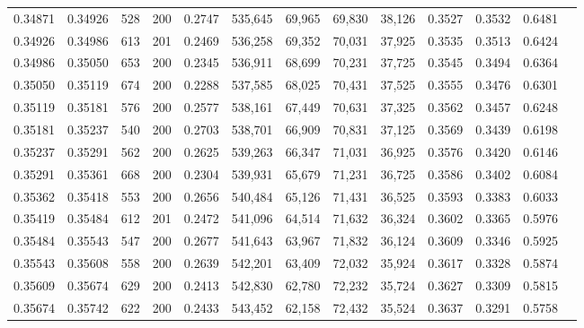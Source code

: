 \begin{tabular}{rrrrrrrrrrrrr}
0.34871 & 0.34926 &   528 & 200 &                                     0.2747 & 535,645 &  69,965 &  69,830 &  38,126 & 0.3527 & 0.3532 & 0.6481 \\
0.34926 & 0.34986 &   613 & 201 &                                     0.2469 & 536,258 &  69,352 &  70,031 &  37,925 & 0.3535 & 0.3513 & 0.6424 \\
0.34986 & 0.35050 &   653 & 200 &                                     0.2345 & 536,911 &  68,699 &  70,231 &  37,725 & 0.3545 & 0.3494 & 0.6364 \\
0.35050 & 0.35119 &   674 & 200 &                                     0.2288 & 537,585 &  68,025 &  70,431 &  37,525 & 0.3555 & 0.3476 & 0.6301 \\
0.35119 & 0.35181 &   576 & 200 &                                     0.2577 & 538,161 &  67,449 &  70,631 &  37,325 & 0.3562 & 0.3457 & 0.6248 \\
0.35181 & 0.35237 &   540 & 200 &                                     0.2703 & 538,701 &  66,909 &  70,831 &  37,125 & 0.3569 & 0.3439 & 0.6198 \\
0.35237 & 0.35291 &   562 & 200 &                                     0.2625 & 539,263 &  66,347 &  71,031 &  36,925 & 0.3576 & 0.3420 & 0.6146 \\
0.35291 & 0.35361 &   668 & 200 &                                     0.2304 & 539,931 &  65,679 &  71,231 &  36,725 & 0.3586 & 0.3402 & 0.6084 \\
0.35362 & 0.35418 &   553 & 200 &                                     0.2656 & 540,484 &  65,126 &  71,431 &  36,525 & 0.3593 & 0.3383 & 0.6033 \\
0.35419 & 0.35484 &   612 & 201 &                                     0.2472 & 541,096 &  64,514 &  71,632 &  36,324 & 0.3602 & 0.3365 & 0.5976 \\
0.35484 & 0.35543 &   547 & 200 &                                     0.2677 & 541,643 &  63,967 &  71,832 &  36,124 & 0.3609 & 0.3346 & 0.5925 \\
0.35543 & 0.35608 &   558 & 200 &                                     0.2639 & 542,201 &  63,409 &  72,032 &  35,924 & 0.3617 & 0.3328 & 0.5874 \\
0.35609 & 0.35674 &   629 & 200 &                                     0.2413 & 542,830 &  62,780 &  72,232 &  35,724 & 0.3627 & 0.3309 & 0.5815 \\
0.35674 & 0.35742 &   622 & 200 &                                     0.2433 & 543,452 &  62,158 &  72,432 &  35,524 & 0.3637 & 0.3291 & 0.5758 \\

\end{tabular}
